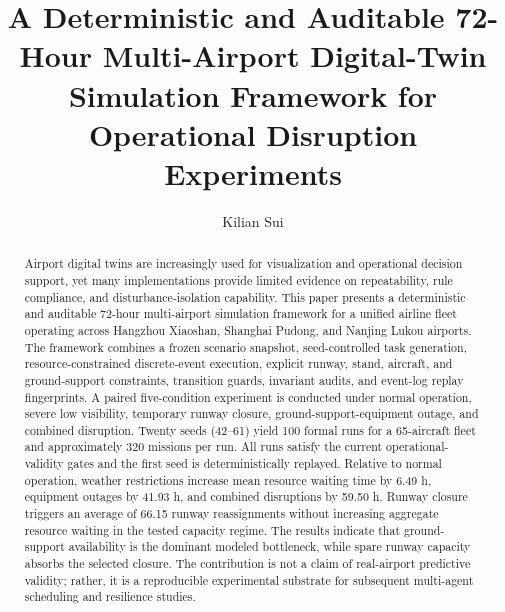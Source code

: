 \documentclass[runningheads]{llncs}
\title{A Deterministic and Auditable 72-Hour Multi-Airport Digital-Twin Simulation Framework for Operational Disruption Experiments}
\author{Kilian Sui}
\institute{Affiliation to be confirmed for submission\\\email{Corresponding email to be confirmed}}
\begin{document}
\maketitle

\begin{abstract}
Airport digital twins are increasingly used for visualization and operational decision support, yet many implementations provide limited evidence on repeatability, rule compliance, and disturbance-isolation capability. This paper presents a deterministic and auditable 72-hour multi-airport simulation framework for a unified airline fleet operating across Hangzhou Xiaoshan, Shanghai Pudong, and Nanjing Lukou airports. The framework combines a frozen scenario snapshot, seed-controlled task generation, resource-constrained discrete-event execution, explicit runway, stand, aircraft, and ground-support constraints, transition guards, invariant audits, and event-log replay fingerprints. A paired five-condition experiment is conducted under normal operation, severe low visibility, temporary runway closure, ground-support-equipment outage, and combined disruption. Twenty seeds (42--61) yield 100 formal runs for a 65-aircraft fleet and approximately 320 missions per run. All runs satisfy the current operational-validity gates and the first seed is deterministically replayed. Relative to normal operation, weather restrictions increase mean resource waiting time by 6.49 h, equipment outages by 41.93 h, and combined disruptions by 59.50 h. Runway closure triggers an average of 66.15 runway reassignments without increasing aggregate resource waiting in the tested capacity regime. The results indicate that ground-support availability is the dominant modeled bottleneck, while spare runway capacity absorbs the selected closure. The contribution is not a claim of real-airport predictive validity; rather, it is a reproducible experimental substrate for subsequent multi-agent scheduling and resilience studies.

\end{abstract}
\end{document}
